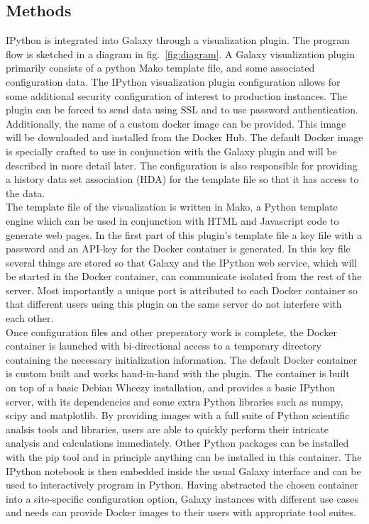 \documentclass{bioinfo}
\begin{document}
\begin{methods}
\section{Methods}

IPython is integrated into Galaxy through a visualization plugin. The program flow is sketched in a diagram in fig.~\ref{fig:diagram}. A Galaxy visualization plugin primarily consists of a python Mako template file, and some associated configuration data. The IPython visualization plugin configuration allows for some additional security configuration of interest to production instances. The plugin can be forced to send data using SSL and to use password authentication. Additionally, the name of a custom docker image can be provided. This image will be downloaded and installed from the Docker Hub. The default Docker image is specially crafted to use in conjunction with the Galaxy plugin and will be described in more detail later. The configuration is also responsible for providing a history data set association (HDA) for the template file so that it has access to the data. \\
The template file of the visualization is written in Mako, a Python template engine which can be used in conjunction with HTML and Javascript code to generate web pages. In the first part of this plugin's template file a key file with a password and an API-key for the Docker container is generated. In this key file several things are stored so that Galaxy and the IPython web service, which will be started in the Docker container, can communicate isolated from the rest of the server. Most importantly a unique port is attributed to each Docker container so that different users using this plugin on the same server do not interfere with each other. \\
Once configuration files and other preperatory work is complete, the Docker container is launched with bi-directional access to a temporary directory containing the necessary initialization information. The default Docker container is custom built and works hand-in-hand with the plugin. The container is built on top of a basic Debian Wheezy installation, and provides a basic IPython server, with its dependencies and some extra Python libraries such as numpy, scipy and matplotlib. By providing images with a full suite of Python scientific analsis tools and libraries, users are able to quickly perform their intricate analysis and calculations immediately. Other Python packages can be installed with the pip tool and in principle anything can be installed in this container. The IPython notebook is then embedded inside the usual Galaxy interface and can be used to interactively program in Python. Having abstracted the chosen container into a site-specific configuration option, Galaxy instances with different use cases and needs can provide Docker images to their users with appropriate tool suites.\\

\end{methods}
\end{document}
